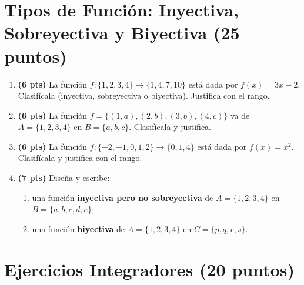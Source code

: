\documentclass[12pt, letterpaper]{article}
\begin{document}
\section{Tipos de Función: Inyectiva, Sobreyectiva y Biyectiva (25 puntos)}

\begin{enumerate}[leftmargin=*]
  \item \textbf{(6 pts)} La función $f: \{1,2,3,4\} \rightarrow \{1,4,7,10\}$ está dada por $f(x) = 3x - 2$. Clasifícala (inyectiva, sobreyectiva o biyectiva). Justifica con el rango.

  \item \textbf{(6 pts)} La función $f = \{(1,a), (2,b), (3,b), (4,c)\}$ va de $A = \{1,2,3,4\}$ en $B = \{a,b,c\}$. Clasifícala y justifica.

  \item \textbf{(6 pts)} La función $f: \{-2,-1,0,1,2\} \rightarrow \{0,1,4\}$ está dada por $f(x) = x^2$. Clasifícala y justifica con el rango.

  \item \textbf{(7 pts)} Diseña y escribe:
        \begin{enumerate}[label=\alph*)]
          \item una función \textbf{inyectiva pero no sobreyectiva} de $A = \{1,2,3,4\}$ en $B = \{a,b,c,d,e\}$;
          \item una función \textbf{biyectiva} de $A = \{1,2,3,4\}$ en $C = \{p,q,r,s\}$.
        \end{enumerate}
\end{enumerate}

\newpage

\section{Ejercicios Integradores (20 puntos)}
\end{document}
